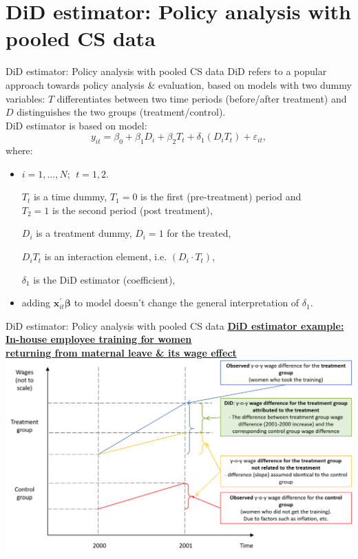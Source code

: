 \documentclass{beamer}
\begin{document}
\section{DiD estimator: Policy analysis with pooled CS data}
\begin{frame}{DiD estimator: Policy analysis with pooled CS data} 
\small
DiD refers to a popular approach towards policy analysis \& evaluation, based on models with two dummy variables: $T$ differentiates between two time periods (before/after treatment) and $D$ distinguishes the two groups (treatment/control). \\ \medskip 
DiD estimator is based on model: \\ 
$$y_{it}=\beta_0 + \beta_1 D_i + \beta_2 T_t + \delta_1 (D_i T_t) + \varepsilon_{it},$$
where:
\begin{itemize}
\item $i=1, \dots, N;~~t=1,2$. \\
\item[$T_t$] is a time dummy, $T_1=0$ is the first (pre-treatment) period and \\$T_2 = 1$ is the second period (post treatment),
\item[$D_i$] is a treatment dummy, $D_i=1$ for the treated,
\item[$D_i T_t$] is an interaction element, i.e. $(D_i\! \cdot \! T_t)$,
\item[$\delta_1$] is the DiD estimator (coefficient),
\item adding $\bm{x}_{it}^{\prime}\bm{\beta}$ to model doesn't change the general interpretation of $\delta_1$.
\end{itemize}
\end{frame}
\begin{frame}{DiD estimator: Policy analysis with pooled CS data}
\vfill
{\footnotesize \underline{\textbf{DiD estimator example: In-house employee training for women}} \\
\underline{\textbf{returning from maternal leave \& its wage effect}}} \\
\medskip
\includegraphics[width=\textwidth]{./IMG/Obrazek3}
\end{frame}
\end{document}
